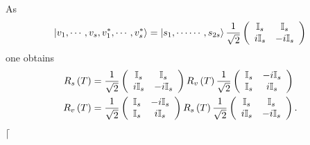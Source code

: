 \documentclass[aps,preprint]{revtex4}%
\begin{document}
As%
\begin{equation}
\left\vert v_{1},\cdots,v_{s},v_{1}^{\ast},\cdots,v_{s}^{\ast}\right\rangle
=\left\vert s_{1},\cdots\cdots,s_{2s}\right\rangle \frac{1}{\sqrt{2}}\left(
\begin{array}
[c]{cc}%
\mathbb{I}_{s} & \mathbb{I}_{s}\\
i\mathbb{I}_{s} & -i\mathbb{I}_{s}%
\end{array}
\right)
\end{equation}
one obtains%
\begin{align}
R_{s}\left(  T\right)   &  =\frac{1}{\sqrt{2}}\left(
\begin{array}
[c]{cc}%
\mathbb{I}_{s} & \mathbb{I}_{s}\\
i\mathbb{I}_{s} & -i\mathbb{I}_{s}%
\end{array}
\right)  R_{v}\left(  T\right)  \frac{1}{\sqrt{2}}\left(
\begin{array}
[c]{cc}%
\mathbb{I}_{s} & -i\mathbb{I}_{s}\\
\mathbb{I}_{s} & i\mathbb{I}_{s}%
\end{array}
\right) \\
R_{v}\left(  T\right)   &  =\frac{1}{\sqrt{2}}\left(
\begin{array}
[c]{cc}%
\mathbb{I}_{s} & -i\mathbb{I}_{s}\\
\mathbb{I}_{s} & i\mathbb{I}_{s}%
\end{array}
\right)  R_{s}\left(  T\right)  \frac{1}{\sqrt{2}}\left(
\begin{array}
[c]{cc}%
\mathbb{I}_{s} & \mathbb{I}_{s}\\
i\mathbb{I}_{s} & -i\mathbb{I}_{s}%
\end{array}
\right)  .
\end{align}
$\lceil$
\end{document}
